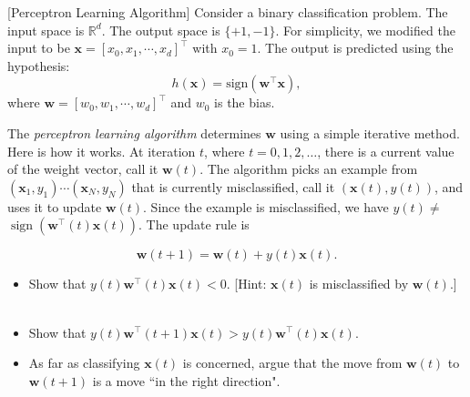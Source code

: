 \item {} [Perceptron Learning Algorithm]
Consider a binary classification problem. The input space is $\mathbb{R}^{d}$. The output space is $\{ +1, -1 \}$. For simplicity, we modified the input to be $\mathbf{x} = [x_0, x_1, \cdots, x_d]^{\top}$ with $x_0=1$. The output is predicted using the hypothesis:
\begin{equation}
    h(\mathbf{x}) = \text{sign}(\mathbf{w}^{\top}\mathbf{x}),
\end{equation}
where $\mathbf{w} = [w_0, w_1, \cdots, w_d]^{\top}$ and $w_0$ is the bias.

The \textit{perceptron learning algorithm} determines $\mathbf{w}$ using a simple iterative method. Here is how it works. At iteration $t$, where $t=0,1,2, \ldots$, there is a current value of the weight vector, call it $\mathbf{w}(t)$. The algorithm picks an example from $\left(\mathbf{x}_1, y_1\right) \cdots\left(\mathbf{x}_N, y_N\right)$ that is currently misclassified, call it $(\mathbf{x}(t), y(t))$, and uses it to update $\mathbf{w}(t)$. Since the example is misclassified, we have $y(t) \neq$ $\operatorname{sign}\left(\mathbf{w}^{\top}(t) \mathbf{x}(t)\right)$. The update rule is

\begin{equation}
    \mathbf{w}(t+1)=\mathbf{w}(t)+y(t) \mathbf{x}(t).
\end{equation}

\begin{itemize}
\item[(a)] Show that $y(t) \mathbf{w}^{\top}(t) \mathbf{x}(t)<0$. [Hint: $\mathbf{x}(t)$ is misclassified by $\mathbf{w}(t)$.] ~
\item[(b)] Show that $y(t) \mathbf{w}^{\top}(t+1) \mathbf{x}(t)>y(t) \mathbf{w}^{\top}(t) \mathbf{x}(t)$. ~
\item[(c)]   As far as classifying $\mathbf{x}(t)$ is concerned, argue that the move from $\mathbf{w}(t)$ to $\mathbf{w}(t+1)$ is a move ``in the right direction". ~
\end{itemize}

\solution

